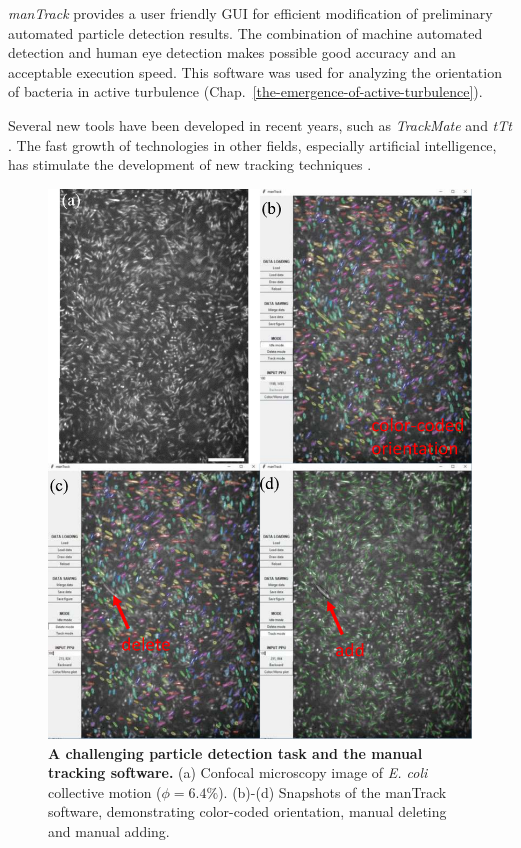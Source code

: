 \textit{manTrack} provides a user friendly GUI for efficient modification of preliminary automated particle detection results. The combination of machine automated detection and human eye detection makes possible good accuracy and an acceptable execution speed. This software was used for analyzing the orientation of bacteria in active turbulence (Chap.~\ref{the-emergence-of-active-turbulence}).

Several new tools have been developed in recent years, such as \textit{TrackMate} and \textit{tTt} \cite{Tinevez2017, Hilsenbeck2016}. The fast growth of technologies in other fields, especially artificial intelligence, has stimulate the development of new tracking techniques \cite{Newby2018, Moen2019}.

\begin{figure}[!h]
	\begin{center}
	\includegraphics[height=5.5 in]{Figs/2-Exp/6.pdf}
	\end{center}
	\caption[A challenging particle detection task and the manual tracking software]
	{
	\textbf{A challenging particle detection task and the manual tracking software.}
	(a) Confocal microscopy image of \textit{E. coli} collective motion ($\phi=6.4\%$).
	(b)-(d) Snapshots of the manTrack software, demonstrating color-coded orientation, manual deleting and manual adding.
	}
	\label{fig:2-6}
\end{figure}

